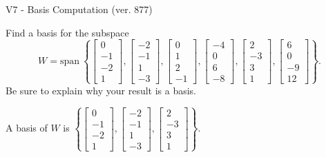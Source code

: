\begin{exercise}
  \begin{exerciseTitle}V7 - Basis Computation (ver. 877)\end{exerciseTitle}
  \begin{exerciseStatement}
    Find a basis for the subspace 
\[W=\mathrm{span}\ \left\{\left[\begin{array}{r}
0 \\
-1 \\
-2 \\
1
\end{array}\right] , \left[\begin{array}{r}
-2 \\
-1 \\
1 \\
-3
\end{array}\right] , \left[\begin{array}{r}
0 \\
1 \\
2 \\
-1
\end{array}\right] , \left[\begin{array}{r}
-4 \\
0 \\
6 \\
-8
\end{array}\right] , \left[\begin{array}{r}
2 \\
-3 \\
3 \\
1
\end{array}\right] , \left[\begin{array}{r}
6 \\
0 \\
-9 \\
12
\end{array}\right]\right\}.\]
 Be sure to explain why your result is a basis.


  \end{exerciseStatement}
  \begin{exerciseAnswer}
   A basis of \(W\) is  \(\left\{\left[\begin{array}{r}
0 \\
-1 \\
-2 \\
1
\end{array}\right] , \left[\begin{array}{r}
-2 \\
-1 \\
1 \\
-3
\end{array}\right] , \left[\begin{array}{r}
2 \\
-3 \\
3 \\
1
\end{array}\right]\right\}\).
  


  \end{exerciseAnswer}
\end{exercise}